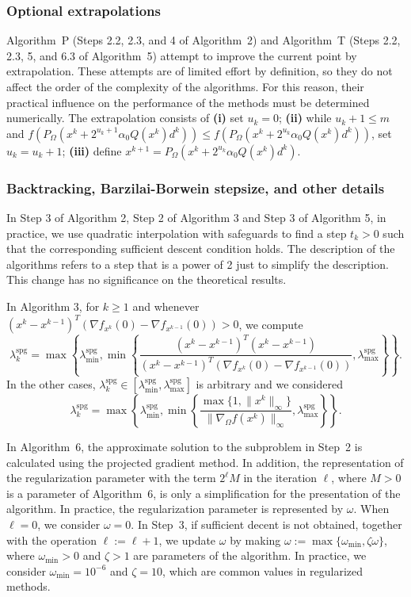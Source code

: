 \documentclass[11pt]{article}
\begin{document}
\subsubsection{Optional extrapolations} \label{sec313}

Algorithm~P (Steps 2.2, 2.3, and 4 of Algorithm~2) and Algorithm~T (Steps 2.2, 2.3, 5, and 6.3 of Algorithm~5) attempt to improve the current point by extrapolation. These attempts are of limited effort by definition, so they do not affect the order of the complexity of the algorithms. For this reason, their practical influence on the performance of the methods must be determined numerically. The extrapolation consists of
\textbf{(i)} set $u_k=0$; 
\textbf{(ii)} while $u_k + 1\leq m$ and $f(P_{\Omega}(x^k + 2^{u_k+1} \alpha_0 Q(x^k) d^k)) \leq f(P_{\Omega}(x^k + 2^{u_k} \alpha_0 Q(x^k) d^k))$, set $u_k = u_k + 1$; \textbf{(iii)} define $x^{k+1} = P_{\Omega}(x^k +2^{u_k} \alpha_0 Q(x^k) d^k)$.

\subsubsection{Backtracking, Barzilai-Borwein stepsize, and other details} \label{sec314}

In Step 3 of Algorithm 2, Step 2 of Algorithm 3 and Step 3 of Algorithm 5, in practice, we use quadratic interpolation with safeguards to find a step $t_k>0$ such that the corresponding sufficient descent condition holds. The description of the algorithms refers to a step that is a power of 2 just to simplify the description. This change has no significance on the theoretical results.

In Algorithm 3, for $k \geq 1$ and whenever \small $(x^k - x^{k-1})^T (\nabla f_{x^k}(0) - \nabla f_{x^{k-1}}(0)) > 0$\normalsize, we compute
\small
\[
\lambda_k^{\mathrm{spg}} = \max \left\{ \lambda_{\min}^{\mathrm{spg}}, \min\left\{ \frac{(x^k - x^{k-1})^T (x^k - x^{k-1})}{(x^k - x^{k-1})^T (\nabla f_{x^k}(0) - \nabla f_{x^{k-1}}(0))}, \lambda_{\max}^{\mathrm{spg}} \right\} \right\}.
\]
\normalsize
In the other cases, $\lambda_k^{\mathrm{spg}} \in [\lambda_{\min}^{\mathrm{spg}},\lambda_{\max}^{\mathrm{spg}}]$ is arbitrary and we considered
\small
\[
\lambda_k^{\mathrm{spg}} = \max \left\{ \lambda_{\min}^{\mathrm{spg}}, \min\left\{ \frac{\max\{ 1, \| x^k \|_\infty \}}{\| \nabla_{\Omega}f(x^k) \|_\infty}, \lambda_{\max}^{\mathrm{spg}} \right\} \right\}.
\]
\normalsize

In Algorithm~6, the approximate solution to the subproblem in Step~2 is calculated using the projected gradient method. In addition, the representation of the regularization parameter with the term $2^\ell M$ in the iteration $\ell$, where $M>0$ is a parameter of Algorithm~6, is only a simplification for the presentation of the algorithm. In practice, the regularization parameter is represented by $\omega$. When $\ell=0$, we consider $\omega=0$. In Step~3, if sufficient decent is not obtained, together with the operation $\ell := \ell+1$, we update $\omega$ by making $\omega := \max\{ \omega_{\min}, \zeta \omega\}$, where $\omega_{\min}>0$ and $\zeta>1$ are parameters of the algorithm. In practice, we consider $\omega_{\min}=10^{-6}$ and $\zeta=10$, which are common values in regularized methods.
\end{document}
